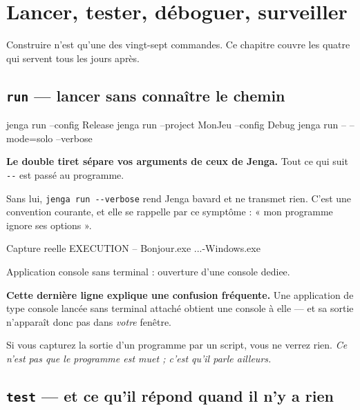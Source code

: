 \chapter{Lancer, tester, déboguer, surveiller}

Construire n'est qu'une des vingt-sept commandes. Ce chapitre couvre les quatre
qui servent tous les jours après.

\section{\texttt{run} --- lancer sans connaître le chemin}

\begin{nkcode}{}
jenga run --config Release
jenga run --project MonJeu --config Debug
jenga run -- --mode=solo --verbose
\end{nkcode}

\begin{nkretenir}
\textbf{Le double tiret sépare vos arguments de ceux de Jenga.} Tout ce qui suit
\texttt{-{}-} est passé au programme.

Sans lui, \texttt{jenga run -{}-verbose} rend Jenga bavard et ne transmet rien.
C'est une convention courante, et elle se rappelle par ce symptôme : « mon
programme ignore ses options ».
\end{nkretenir}

\begin{nkcode}{Capture reelle}
  EXECUTION  --  Bonjour.exe
     ...\Build\Bin\Release-Windows\Bonjour\Bonjour.exe

Application console sans terminal : ouverture d'une console dediee.
\end{nkcode}

\begin{nkretenir}
\textbf{Cette dernière ligne explique une confusion fréquente.} Une application
de type console lancée sans terminal attaché obtient une console à elle --- et sa
sortie n'apparaît donc pas dans \emph{votre} fenêtre.

Si vous capturez la sortie d'un programme par un script, vous ne verrez rien.
\emph{Ce n'est pas que le programme est muet ; c'est qu'il parle ailleurs.}
\end{nkretenir}

\section{\texttt{test} --- et ce qu'il répond quand il n'y a rien}


